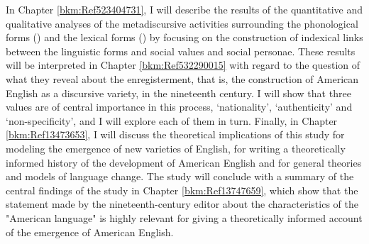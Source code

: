 In Chapter \ref{bkm:Ref523404731}, I will describe the results of the quantitative and qualitative analyses of the metadiscursive activities surrounding the phonological forms () and the lexical forms () by focusing on the construction of indexical links between the linguistic forms and social values and social personae. These results will be interpreted in Chapter \ref{bkm:Ref532290015} with regard to the question of what they reveal about the enregisterment, that is, the construction of American English as a discursive variety, in the nineteenth century. I will show that three values are of central importance in this process, ‘nationality’, ‘authenticity’ and ‘non-specificity’, and I will explore each of them in turn. Finally, in Chapter \ref{bkm:Ref13473653}, I will discuss the theoretical implications of this study for modeling the emergence of new varieties of English, for writing a theoretically informed history of the development of American English and for general theories and models of language change. The study will conclude with a summary of the central findings of the study in Chapter \ref{bkm:Ref13747659}, which show that the statement made by the nineteenth-century editor about the characteristics of the "American language" is highly relevant for giving a theoretically informed account of the emergence of American English.

